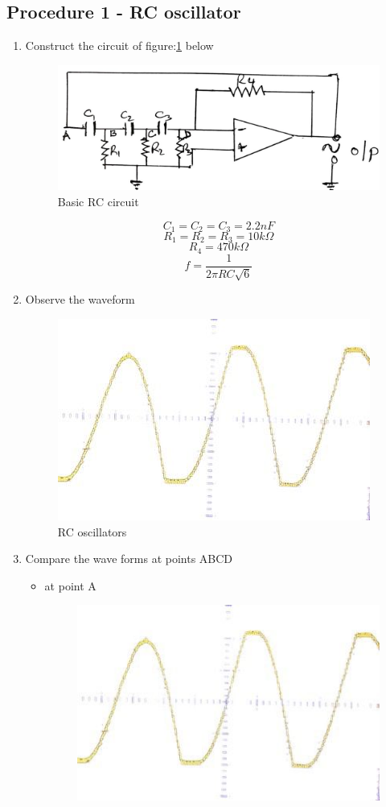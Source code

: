 \documentclass[12pt,a4paper]{report}
\begin{document}
\subsection{Procedure 1 - RC oscillator}
\begin{enumerate}
    \item Construct the circuit of figure:\ref{fig:1} below
    \begin{figure}[H]
        \centering
        \includegraphics[width=0.5\linewidth]{circuit1_1.jpeg}
        \caption{Basic RC circuit}
        \label{fig:1}
    \end{figure}
    $$ C_1 = C_2 = C_3 = 2.2nF$$
    $$ R_1 = R_2 = R_3 = 10k \Omega$$
    $$ R_4 = 470k \Omega$$
    $$ f = \frac{1}{2 \pi RC \sqrt{6}}$$
    \item Observe the waveform
    \begin{figure}[H]
        \centering
        \includegraphics[width=0.5\linewidth]{1.jpeg}
        \caption{RC oscillators}
        \label{fig:enter-label}
    \end{figure}
    \item Compare the wave forms at points ABCD
    \begin{itemize}
        \item at point A
        \begin{figure}[H]
        \centering
        \includegraphics[width=0.5\linewidth]{1.jpeg}

\end{figure}
\end{itemize}
\end{enumerate}
\end{document}

